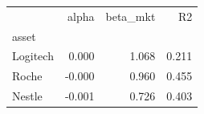 \begin{tabular}{lrrr}
\toprule
 & alpha & beta_mkt & R2 \\
asset &  &  &  \\
\midrule
Logitech & 0.000 & 1.068 & 0.211 \\
Roche & -0.000 & 0.960 & 0.455 \\
Nestle & -0.001 & 0.726 & 0.403 \\
\bottomrule
\end{tabular}

